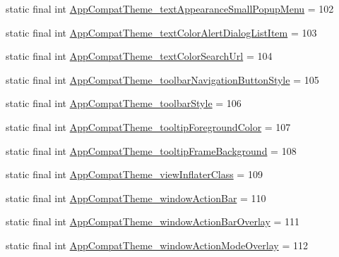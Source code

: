 \begin{DoxyCompactItemize}
\item 
static final int \mbox{\hyperlink{classandroid_1_1support_1_1v7_1_1appcompat_1_1_r_1_1styleable_ad723935e264f9523d53349dbe526fedf}{App\+Compat\+Theme\+\_\+text\+Appearance\+Small\+Popup\+Menu}} = 102
\item 
static final int \mbox{\hyperlink{classandroid_1_1support_1_1v7_1_1appcompat_1_1_r_1_1styleable_a22498b29580fd39a0825e692be71697a}{App\+Compat\+Theme\+\_\+text\+Color\+Alert\+Dialog\+List\+Item}} = 103
\item 
static final int \mbox{\hyperlink{classandroid_1_1support_1_1v7_1_1appcompat_1_1_r_1_1styleable_a5670522074accb9485b25777e1735cef}{App\+Compat\+Theme\+\_\+text\+Color\+Search\+Url}} = 104
\item 
static final int \mbox{\hyperlink{classandroid_1_1support_1_1v7_1_1appcompat_1_1_r_1_1styleable_ab58f6974601f3be1dd340d0b7b67fedd}{App\+Compat\+Theme\+\_\+toolbar\+Navigation\+Button\+Style}} = 105
\item 
static final int \mbox{\hyperlink{classandroid_1_1support_1_1v7_1_1appcompat_1_1_r_1_1styleable_adcbf3e914a6c4875f17697c3e0a5330f}{App\+Compat\+Theme\+\_\+toolbar\+Style}} = 106
\item 
static final int \mbox{\hyperlink{classandroid_1_1support_1_1v7_1_1appcompat_1_1_r_1_1styleable_adf90290b0a61ae9e89eb1da3a4da3d43}{App\+Compat\+Theme\+\_\+tooltip\+Foreground\+Color}} = 107
\item 
static final int \mbox{\hyperlink{classandroid_1_1support_1_1v7_1_1appcompat_1_1_r_1_1styleable_a30e4ad917aa03ab0e8e5f3de2cb205eb}{App\+Compat\+Theme\+\_\+tooltip\+Frame\+Background}} = 108
\item 
static final int \mbox{\hyperlink{classandroid_1_1support_1_1v7_1_1appcompat_1_1_r_1_1styleable_a233e1bc8decdde127070f9d742a50f31}{App\+Compat\+Theme\+\_\+view\+Inflater\+Class}} = 109
\item 
static final int \mbox{\hyperlink{classandroid_1_1support_1_1v7_1_1appcompat_1_1_r_1_1styleable_a54e3e68c0557978c12c85a536626483a}{App\+Compat\+Theme\+\_\+window\+Action\+Bar}} = 110
\item 
static final int \mbox{\hyperlink{classandroid_1_1support_1_1v7_1_1appcompat_1_1_r_1_1styleable_a7e3bd8a86a5026ca9e855e3c8aa6b2e9}{App\+Compat\+Theme\+\_\+window\+Action\+Bar\+Overlay}} = 111
\item 
static final int \mbox{\hyperlink{classandroid_1_1support_1_1v7_1_1appcompat_1_1_r_1_1styleable_ad94883f936158d1e9eb6484ab1ea146c}{App\+Compat\+Theme\+\_\+window\+Action\+Mode\+Overlay}} = 112

\end{DoxyCompactItemize}
